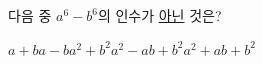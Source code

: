 다음 중 $a^6-b^6$의 인수가 \underline{아닌} 것은?
\begin{choices32}{$a+b$}{$a-b$}{$a^2+b^2$}{$a^2-ab+b^2$}{$a^2+ab+b^2$}\end{choices32}

